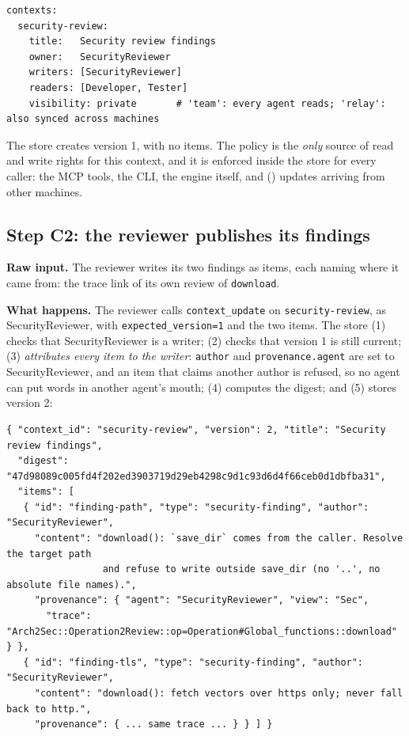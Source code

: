 \documentclass[10pt,a4paper]{article}
\newcommand{\code}[1]{\texttt{#1}}
\theoremstyle{definition}
\newcommand{\what}[1]{\par\smallskip\noindent\textbf{#1}\quad}
\begin{document}
\begin{lstlisting}[style=model, caption={The \code{security-review} context declared for the \texttt{chakin} team.}, label={lst:ctx-decl}]
contexts:
  security-review:
    title:   Security review findings
    owner:   SecurityReviewer
    writers: [SecurityReviewer]
    readers: [Developer, Tester]
    visibility: private       # 'team': every agent reads; 'relay': also synced across machines
\end{lstlisting}

\noindent The store creates version 1, with no items. The policy is the
\emph{only} source of read and write rights for this context, and it is
enforced inside the store for every caller: the MCP tools, the CLI, the
engine itself, and () updates arriving from other machines.

\subsection{Step C2: the reviewer publishes its findings}

\what{Raw input.} The reviewer writes its two findings as items, each naming
where it came from: the trace link of its own review of \code{download}.

\what{What happens.} The reviewer calls \code{context\_update} on
\code{security-review}, as SecurityReviewer, with \code{expected\_version=1}
and the two items. The store
(1) checks that SecurityReviewer is a writer; (2) checks that version 1 is
still current; (3) \emph{attributes every item to the writer}: \code{author}
and \code{provenance.agent} are set to SecurityReviewer, and an item that
claims another author is refused, so no agent can put words in another
agent's mouth; (4) computes the digest; and (5) stores version 2:

\begin{lstlisting}[style=engine, caption={Engine state: version 2 of \code{security-review}.}, label={lst:ctx-v2}]
{ "context_id": "security-review", "version": 2, "title": "Security review findings",
  "digest": "47d98089c005fd4f202ed3903719d29eb4298c9d1c93d6d4f66ceb0d1dbfba31",
  "items": [
   { "id": "finding-path", "type": "security-finding", "author": "SecurityReviewer",
     "content": "download(): `save_dir` comes from the caller. Resolve the target path
                 and refuse to write outside save_dir (no '..', no absolute file names).",
     "provenance": { "agent": "SecurityReviewer", "view": "Sec",
       "trace": "Arch2Sec::Operation2Review::op=Operation#Global_functions::download" } },
   { "id": "finding-tls", "type": "security-finding", "author": "SecurityReviewer",
     "content": "download(): fetch vectors over https only; never fall back to http.",
     "provenance": { ... same trace ... } } ] }
\end{lstlisting}
\end{document}
